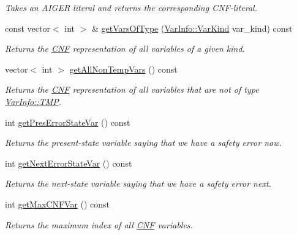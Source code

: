 \begin{DoxyCompactItemize}
\begin{DoxyCompactList}\small\item\em Takes an A\-I\-G\-E\-R literal and returns the corresponding C\-N\-F-\/literal. \end{DoxyCompactList}\item 
const vector$<$ int $>$ \& \hyperlink{classVarManager_a9da8cbfff80af5b7b8c2910fa815ee8a}{get\-Vars\-Of\-Type} (\hyperlink{classVarInfo_a64d1da76cf84fe674e5fef9764ef11cf}{Var\-Info\-::\-Var\-Kind} var\-\_\-kind) const 
\begin{DoxyCompactList}\small\item\em Returns the \hyperlink{classCNF}{C\-N\-F} representation of all variables of a given kind. \end{DoxyCompactList}\item 
vector$<$ int $>$ \hyperlink{classVarManager_a919243b695dc887455b686f7f5de2b78}{get\-All\-Non\-Temp\-Vars} () const 
\begin{DoxyCompactList}\small\item\em Returns the \hyperlink{classCNF}{C\-N\-F} representation of all variables that are not of type \hyperlink{classVarInfo_a64d1da76cf84fe674e5fef9764ef11cfa84a2d8d86f004930fe564dc5b395b29f}{Var\-Info\-::\-T\-M\-P}. \end{DoxyCompactList}\item 
int \hyperlink{classVarManager_ad513fd225fca60d46a32b506adac917a}{get\-Pres\-Error\-State\-Var} () const 
\begin{DoxyCompactList}\small\item\em Returns the present-\/state variable saying that we have a safety error now. \end{DoxyCompactList}\item 
int \hyperlink{classVarManager_a6e3b7a26534cdc707086a9e850dcbd5e}{get\-Next\-Error\-State\-Var} () const 
\begin{DoxyCompactList}\small\item\em Returns the next-\/state variable saying that we have a safety error next. \end{DoxyCompactList}\item 
int \hyperlink{classVarManager_ae6cdfc7d517427cfe8619c123dc72b9b}{get\-Max\-C\-N\-F\-Var} () const 
\begin{DoxyCompactList}\small\item\em Returns the maximum index of all \hyperlink{classCNF}{C\-N\-F} variables. \end{DoxyCompactList}\item 

\end{DoxyCompactItemize}
